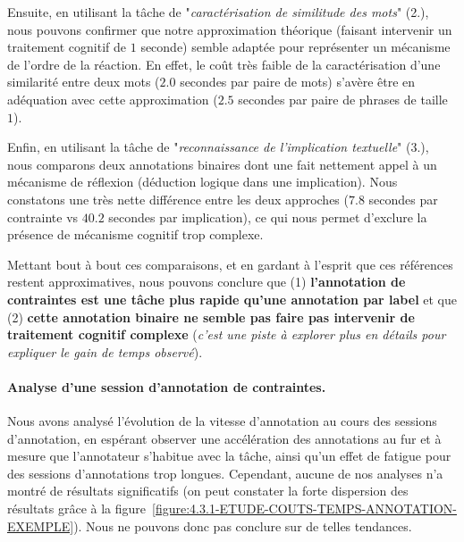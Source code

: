 			Ensuite, en utilisant la tâche de "\textit{caractérisation de similitude des mots}" (2.), nous pouvons confirmer que notre approximation théorique (faisant intervenir un traitement cognitif de $1$ seconde) semble adaptée pour représenter un mécanisme de l'ordre de la réaction.
			En effet, le coût très faible de la caractérisation d'une similarité entre deux mots ($2.0$ secondes par paire de mots) s'avère être en adéquation avec cette approximation ($2.5$ secondes par paire de phrases de taille $1$).
			
			Enfin, en utilisant la tâche de "\textit{reconnaissance de l'implication textuelle}" (3.), nous comparons deux annotations binaires dont une fait nettement appel à un mécanisme de réflexion (déduction logique dans une implication).
			Nous constatons une très nette différence entre les deux approches ($7.8$ secondes par contrainte vs $40.2$ secondes par implication), ce qui nous permet d'exclure la présence de mécanisme cognitif trop complexe.
	
			\begin{leftBarSummary}
				Mettant bout à bout ces comparaisons, et en gardant à l'esprit que ces références restent approximatives, nous pouvons conclure que (1) \textbf{l'annotation de contraintes est une tâche plus rapide qu'une annotation par label} et que (2) \textbf{cette annotation binaire ne semble pas faire pas intervenir de traitement cognitif complexe} (\textit{c'est une piste à explorer plus en détails pour expliquer le gain de temps observé}).
			\end{leftBarSummary}
		
		
		\paragraph{Analyse d'une session d'annotation de contraintes.}
		
			Nous avons analysé l'évolution de la vitesse d'annotation au cours des sessions d'annotation, en espérant observer une accélération des annotations au fur et à mesure que l'annotateur s'habitue avec la tâche, ainsi qu'un effet de fatigue pour des sessions d'annotations trop longues.
			Cependant, aucune de nos analyses n'a montré de résultats significatifs (on peut constater la forte dispersion des résultats grâce à la figure~\ref{figure:4.3.1-ETUDE-COUTS-TEMPS-ANNOTATION-EXEMPLE}).
			Nous ne pouvons donc pas conclure sur de telles tendances.
			
